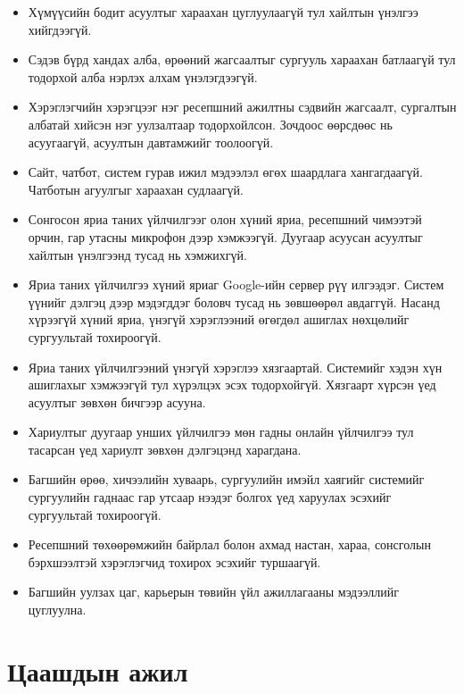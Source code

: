 \begin{itemize}
    \item Хүмүүсийн бодит асуултыг хараахан цуглуулаагүй тул хайлтын үнэлгээ хийгдээгүй.
    \item Сэдэв бүрд хандах алба, өрөөний жагсаалтыг сургууль хараахан батлаагүй тул тодорхой алба нэрлэх алхам үнэлэгдээгүй.
    \item Хэрэглэгчийн хэрэгцээг нэг ресепшний ажилтны сэдвийн жагсаалт, сургалтын албатай хийсэн нэг уулзалтаар тодорхойлсон. Зочдоос өөрсдөөс нь асуугаагүй, асуултын давтамжийг тоолоогүй.
    \item Сайт, чатбот, систем гурав ижил мэдээлэл өгөх шаардлага хангагдаагүй. Чатботын агуулгыг хараахан судлаагүй.
    \item Сонгосон яриа таних үйлчилгээг олон хүний яриа, ресепшний чимээтэй орчин, гар утасны микрофон дээр хэмжээгүй. Дуугаар асуусан асуултыг хайлтын үнэлгээнд тусад нь хэмжихгүй.
    \item Яриа таних үйлчилгээ хүний яриаг Google-ийн сервер рүү илгээдэг. Систем үүнийг дэлгэц дээр мэдэгддэг боловч тусад нь зөвшөөрөл авдаггүй. Насанд хүрээгүй хүний яриа, үнэгүй хэрэглээний өгөгдөл ашиглах нөхцөлийг сургуультай тохироогүй.
    \item Яриа таних үйлчилгээний үнэгүй хэрэглээ хязгаартай. Системийг хэдэн хүн ашиглахыг хэмжээгүй тул хүрэлцэх эсэх тодорхойгүй. Хязгаарт хүрсэн үед асуултыг зөвхөн бичгээр асууна.
    \item Хариултыг дуугаар унших үйлчилгээ мөн гадны онлайн үйлчилгээ тул тасарсан үед хариулт зөвхөн дэлгэцэнд харагдана.
    \item Багшийн өрөө, хичээлийн хуваарь, сургуулийн имэйл хаягийг системийг сургуулийн гаднаас гар утсаар нээдэг болгох үед харуулах эсэхийг сургуультай тохироогүй.
    \item Ресепшний төхөөрөмжийн байрлал болон ахмад настан, хараа, сонсголын бэрхшээлтэй хэрэглэгчид тохирох эсэхийг туршаагүй.
    \item Багшийн уулзах цаг, карьерын төвийн үйл ажиллагааны мэдээллийг цуглуулна.
\end{itemize}

\section{Цаашдын ажил}
\label{sec:next-week}
